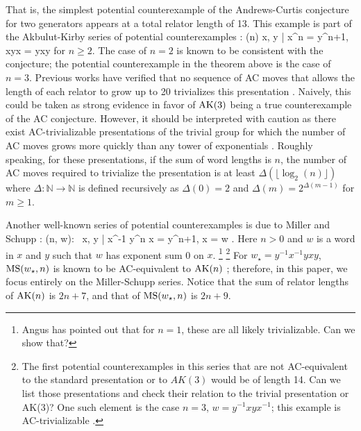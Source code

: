 That is, the simplest potential counterexample of the Andrews-Curtis conjecture for two generators
appears at a total relator length of 13.
This example is part of the Akbulut-Kirby series of potential counterexamples \cite{Akbulut-Kirby}:
\bea
\AK(n) \colon \langle x, y | x^n = y^{n+1}, xyx = yxy\rangle
\eea
for $n \geq 2.$ The case of $n=2$ is known to be consistent with the conjecture; the potential counterexample
in the theorem above is the case of $n=3$.
Previous works have verified that no sequence of AC moves that allows the length of each relator to grow up to 20 trivializes this presentation \cite{Panteleev-Ushakov}.
Naively, this could be taken as strong evidence in favor of $\text{AK}(3)$ being a true counterexample of the AC conjecture.
However, it should be interpreted with caution as there exist AC-trivializable presentations of the trivial group for which the number of AC moves grows more quickly than any tower of exponentials \cite{Bridson, Lishak}.
Roughly speaking, for these presentations, if the sum of word lengths is $n$, the number of AC moves required to trivialize the presentation is at least $\Delta (\lfloor \log_2 (n) \rfloor)$ where $\Delta \colon \mathbb{N} \to \mathbb{N}$ is defined recursively as $\Delta(0) = 2$ and $\Delta (m) = 2^{\Delta(m-1)}$ for $m \geq 1$.
\newline

Another well-known series of potential counterexamples is due to Miller and Schupp \cite{Miller-Schupp}:
\bea
\MS(n, w): \ \langle x, y | x^{-1} y^n x = y^{n+1}, x = w \rangle.
\eea
Here $n > 0$ and $w$ is a word in $x$ and $y$ such that $w$ has exponent sum 0
on $x$.
\footnote{Angus has pointed out that for $n=1$, these are all likely trivializable.
Can we show that?
	 }
\footnote{The first potential counterexamples in this series that are not AC-equivalent to the standard presentation or to $AK(3)$ would be of length 14.
Can we list those presentations and	check their relation to the trivial presentation or AK(3)? One such element is the case $n=3$, $w = y^{-1} x y x^{-1}$; this example is AC-trivializable \cite{morse}.}
For $w_\star = y^{-1} x^{-1} y x y$, $\text{MS}(w_\star, n)$ is known to be AC-equivalent to $\text{AK}(n)$ \cite{MMS}; therefore, in this paper, we focus entirely on the Miller-Schupp series.
Notice that the sum of relator lengths of $\text{AK}(n)$ is $2n+7$, and that of $\text{MS}(w_\star, n)$ is $2n+9$.
\newline

